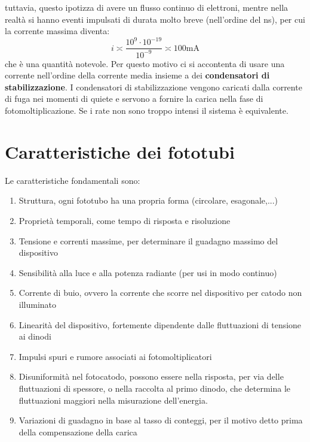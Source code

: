 tuttavia, questo ipotizza di avere un flusso continuo di elettroni, mentre nella realt\`a si hanno eventi impulsati di durata molto breve (nell'ordine del ns), per cui
la corrente massima diventa:
\begin{equation*}
i \asymp \frac{10^9 \cdot 10^{-19}}{10^{-9}} \asymp 100 \text{mA}
\end{equation*}
che \`e una quantit\`a notevole.
Per questo motivo ci si accontenta di usare una corrente nell'ordine della corrente media insieme a dei \textbf{condensatori di stabilizzazione}.
I condensatori di stabilizzazione vengono caricati dalla corrente di fuga nei momenti di quiete e servono a fornire la carica nella fase di fotomoltiplicazione.
Se i rate non sono troppo intensi il sistema \`e equivalente.
\section{Caratteristiche dei fototubi}
Le caratteristiche fondamentali sono:
\begin{enumerate}
\item Struttura, ogni fototubo ha una propria forma (circolare, esagonale,...)
\item Propriet\`a temporali, come tempo di risposta e risoluzione
\item Tensione e correnti massime, per determinare il guadagno massimo del dispositivo
\item Sensibilit\`a alla luce e alla potenza radiante (per usi in modo continuo)
\item Corrente di buio, ovvero la corrente che scorre nel dispositivo per catodo non illuminato
\item Linearit\`a del dispositivo, fortemente dipendente dalle fluttuazioni di tensione ai dinodi
\item Impulsi spuri e rumore associati ai fotomoltiplicatori
\item Disuniformit\`a nel fotocatodo, possono essere nella risposta, per via delle fluttuazioni di spessore, o nella raccolta al primo dinodo, 
che determina le fluttuazioni maggiori nella misurazione dell'energia.
\item Variazioni di guadagno in base al tasso di conteggi, per il motivo detto prima della compensazione della carica
\end{enumerate}
